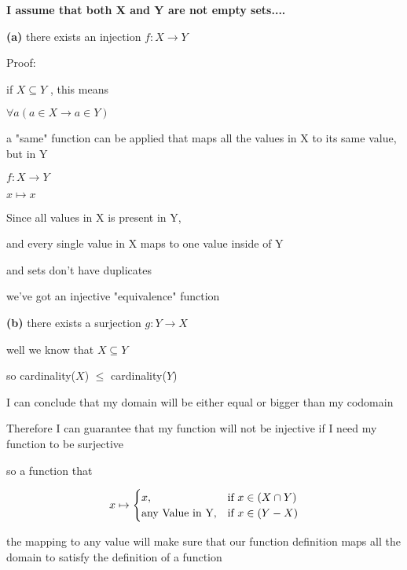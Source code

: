 \documentclass[12pts,A4]{article}
\begin{document}
\begin{flushleft}
    
    \textbf{I assume that both X and Y are not empty sets....}


    \textbf{(a)} there exists an injection $f : X \rightarrow Y$
    \bigskip

    Proof:

    if $ X \subseteq Y$ , this means 
    
    $ \forall a ( a \in X \rightarrow a \in Y) $

    a "same" function can be applied that maps all the values in X to its same value, but in Y

    \bigskip
     $f : X \rightarrow Y$
    
     $ x \mapsto x$ 
    
    \bigskip

    Since all values in X is present in Y,
    
    and every single value in X maps to one value inside of Y
   
    and sets don't have duplicates

    we've got an injective "equivalence" function

    \bigskip
    \bigskip

    

    \textbf{(b)} there exists a surjection $g : Y \rightarrow X$

    well we know that $X \subseteq Y$

    so cardinality($X$) $\leq$ cardinality($Y$)
    
    I can conclude that my domain will be either equal or bigger than my codomain

    Therefore I can guarantee that my function will not be injective if I need my function to be surjective
    \bigskip

    so a function that 


    \begin{equation}
        x \mapsto \begin{cases}
            x,& \text{if $ x \in (X \cap Y)$}\\
            \text{any Value in Y}, & \text{if } x \in (Y - X)
        \end{cases}
    \end{equation}
    
    
    
    \bigskip 
    the mapping to any value will make sure that our function definition maps all the domain to satisfy the definition of a function

\end{flushleft}
\end{document}
